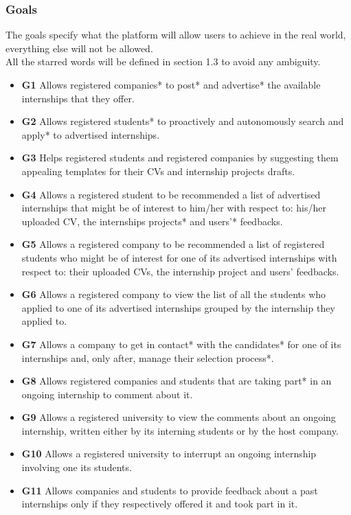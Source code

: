 \documentclass{article}
\begin{document}
\subsubsection{Goals}
The goals specify what the platform will allow users to achieve in the real world, everything else will not be allowed. 
\\All the starred words will be defined in section 1.3 to avoid any ambiguity.
\begin{itemize}
  \item \textbf{G1} Allows registered companies* to post* and advertise* the available internships that they offer.
  \item \textbf{G2} Allows registered students* to proactively and autonomously search and apply* to advertised internships.
  \item \textbf{G3} Helps registered students and registered companies by suggesting them appealing templates for their CVs and internship projects drafts.
  \item \textbf{G4} Allows a registered student to be recommended a list of advertised internships that might be of interest to him/her with respect to: his/her uploaded CV, the internships projects* and users'* feedbacks.
  \item \textbf{G5} Allows a registered company to be recommended a list of registered students who might be of interest for one of its advertised internships with respect to: their uploaded CVs, the internship project and users' feedbacks.
  \item \textbf{G6} Allows a registered company to view the list of all the students who applied to one of its advertised internships grouped by the internship they applied to.
  \item \textbf{G7} Allows a company to get in contact* with the candidates* for one of its internships and, only after, manage their selection process*.
  \item \textbf{G8} Allows registered companies and students that are taking part* in an ongoing internship to comment about it.
  \item \textbf{G9} Allows a registered university to view the comments about an ongoing internship, written either by its interning students or by the host company.
  \item \textbf{G10} Allows a registered university to interrupt an ongoing internship involving one its students.
  \item \textbf{G11} Allows companies and students to provide feedback about a past internships only if they respectively offered it and took part in it.

\end{itemize}
\end{document}
